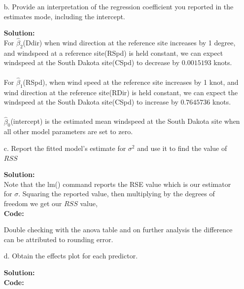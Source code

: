 \documentclass[12pt]{article}
\makeatletter
\theoremstyle{homework}
\newenvironment{exercise}[1]
{\def\@currentlabel{#1}\exercisecore}
{\endexercisecore}
\newcommand{\localhead}[1]{\par\smallskip\noindent\textbf{#1}\nobreak\\}%
\newcommand\solution{\localhead{Solution:}}
\makeatother
\begin{document}
\begin{exercise}{1}
\begin{exercise}{2}
\begin{enumerate}
    \item[b.] Provide an interpretation of the regression coefficient you reported in the estimates mode, including the 
    intercept.\\
    \solution For $\hat{\beta}_2$(Ddir) when wind direction at the reference site increases by 1 degree, and windspeed at a 
    reference site(RSpd) is held constant, we can expect windspeed at the South Dakota site(CSpd) to
    decrease by $0.0015193$ knots. \\\\
    For $\hat{\beta}_1$(RSpd), when wind speed at the reference site increases by 1 knot, and wind direction
    at the reference site(RDir) is held constant, we can expect the windspeed at the South Dakota site(CSpd) to increase by
    $0.7645736$ knots.  \\\\
    $\hat{\beta}_0$(intercept) is the estimated mean windspeed at the South Dakota site when all other model parameters are 
    set to zero.  
    \newpage

    \item[c.] Report the fitted model's estimate for $\sigma^2$ and use it to find the value of $RSS$\\
    \solution Note that the lm() command reports the RSE value which is our estimator for $\sigma$. Squaring the 
    reported value, then multiplying by the degrees of freedom we get our $RSS$ value, \\
    \textbf{Code:}
    \begin{center}
    
    \end{center}
    Double checking with the anova table and on further analysis the difference can be attributed to 
    rounding error.  
    \newpage

    \item[d.] Obtain the effects plot for each predictor.\\
    \solution  
    \textbf{Code:}
    \begin{center}
    
    \end{center}


\end{enumerate}
\end{exercise}
\end{exercise}
\end{document}
